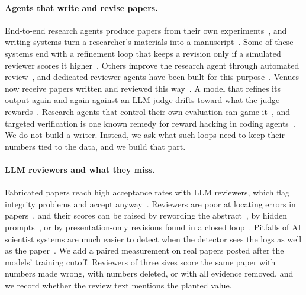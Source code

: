 \paragraph{Agents that write and revise papers.}
End-to-end research agents produce papers from their own
experiments~\cite{lu2024aiscientist,yamada2025aiscientistv2,meng2026scientistone}, and writing systems turn a
researcher's materials into a manuscript~\cite{song2026paperorchestra}. Some of these systems end with a refinement
loop that keeps a revision only if a simulated reviewer scores it higher~\cite{song2026paperorchestra}. Others
improve the research agent through automated review~\cite{weng2024cycleresearcher}, and dedicated reviewer agents
have been built for this purpose~\cite{jin2024agentreview,goyal2026scholarpeer}. Venues now receive papers written
and reviewed this way~\cite{bianchi2025agents4science}. A model that refines its output again and again against an
LLM judge drifts toward what the judge rewards~\cite{pan2024spontaneous}. Research agents that control their own
evaluation can game it~\cite{rewardhackingresearch2026}, and targeted verification is one known remedy for reward
hacking in coding agents~\cite{verificationhorizon2026}. We do not build a writer. Instead, we ask what such loops
need to keep their numbers tied to the data, and we build that part.

\paragraph{LLM reviewers and what they miss.}
Fabricated papers reach high acceptance rates with LLM reviewers, which flag integrity problems and accept
anyway~\cite{badscientist2026}. Reviewers are poor at locating errors in papers~\cite{flaws2025}, and their scores
can be raised by rewording the abstract~\cite{li2026rewording}, by hidden prompts~\cite{sahoo2025injection}, or by
presentation-only revisions found in a closed loop~\cite{nohiddenprompts2026}. Pitfalls of AI scientist systems are
much easier to detect when the detector sees the logs as well as the paper~\cite{luo2025pitfalls}. We add a paired
measurement on real papers posted after the models' training cutoff. Reviewers of three sizes score the same paper
with numbers made wrong, with numbers deleted, or with all evidence removed, and we record whether the review text
mentions the planted value.

